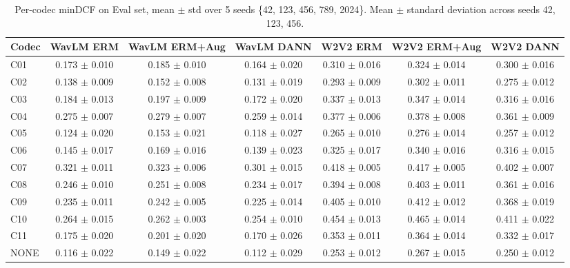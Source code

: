 \begin{table}[t]
\centering
\small
\begin{tabular}{lcccccc}
\toprule
Codec & WavLM ERM & WavLM ERM+Aug & WavLM DANN & W2V2 ERM & W2V2 ERM+Aug & W2V2 DANN \\
\midrule
C01 & 0.173 $\pm$ 0.010 & 0.185 $\pm$ 0.010 & 0.164 $\pm$ 0.020 & 0.310 $\pm$ 0.016 & 0.324 $\pm$ 0.014 & 0.300 $\pm$ 0.016 \\
C02 & 0.138 $\pm$ 0.009 & 0.152 $\pm$ 0.008 & 0.131 $\pm$ 0.019 & 0.293 $\pm$ 0.009 & 0.302 $\pm$ 0.011 & 0.275 $\pm$ 0.012 \\
C03 & 0.184 $\pm$ 0.013 & 0.197 $\pm$ 0.009 & 0.172 $\pm$ 0.020 & 0.337 $\pm$ 0.013 & 0.347 $\pm$ 0.014 & 0.316 $\pm$ 0.016 \\
C04 & 0.275 $\pm$ 0.007 & 0.279 $\pm$ 0.007 & 0.259 $\pm$ 0.014 & 0.377 $\pm$ 0.006 & 0.378 $\pm$ 0.008 & 0.361 $\pm$ 0.009 \\
C05 & 0.124 $\pm$ 0.020 & 0.153 $\pm$ 0.021 & 0.118 $\pm$ 0.027 & 0.265 $\pm$ 0.010 & 0.276 $\pm$ 0.014 & 0.257 $\pm$ 0.012 \\
C06 & 0.145 $\pm$ 0.017 & 0.169 $\pm$ 0.016 & 0.139 $\pm$ 0.023 & 0.325 $\pm$ 0.017 & 0.340 $\pm$ 0.016 & 0.316 $\pm$ 0.015 \\
C07 & 0.321 $\pm$ 0.011 & 0.323 $\pm$ 0.006 & 0.301 $\pm$ 0.015 & 0.418 $\pm$ 0.005 & 0.417 $\pm$ 0.005 & 0.402 $\pm$ 0.007 \\
C08 & 0.246 $\pm$ 0.010 & 0.251 $\pm$ 0.008 & 0.234 $\pm$ 0.017 & 0.394 $\pm$ 0.008 & 0.403 $\pm$ 0.011 & 0.361 $\pm$ 0.016 \\
C09 & 0.235 $\pm$ 0.011 & 0.242 $\pm$ 0.005 & 0.225 $\pm$ 0.014 & 0.405 $\pm$ 0.010 & 0.412 $\pm$ 0.012 & 0.368 $\pm$ 0.019 \\
C10 & 0.264 $\pm$ 0.015 & 0.262 $\pm$ 0.003 & 0.254 $\pm$ 0.010 & 0.454 $\pm$ 0.013 & 0.465 $\pm$ 0.014 & 0.411 $\pm$ 0.022 \\
C11 & 0.175 $\pm$ 0.020 & 0.201 $\pm$ 0.020 & 0.170 $\pm$ 0.026 & 0.353 $\pm$ 0.011 & 0.364 $\pm$ 0.014 & 0.332 $\pm$ 0.017 \\
NONE & 0.116 $\pm$ 0.022 & 0.149 $\pm$ 0.022 & 0.112 $\pm$ 0.029 & 0.253 $\pm$ 0.012 & 0.267 $\pm$ 0.015 & 0.250 $\pm$ 0.012 \\
\bottomrule
\end{tabular}
\caption{Per-codec minDCF on Eval set, mean $\pm$ std over 5 seeds \{42, 123, 456, 789, 2024\}. Mean $\pm$ standard deviation across seeds {42, 123, 456}.}
\label{tab:T2_per_codec_mindcf_seeds}
\end{table}
